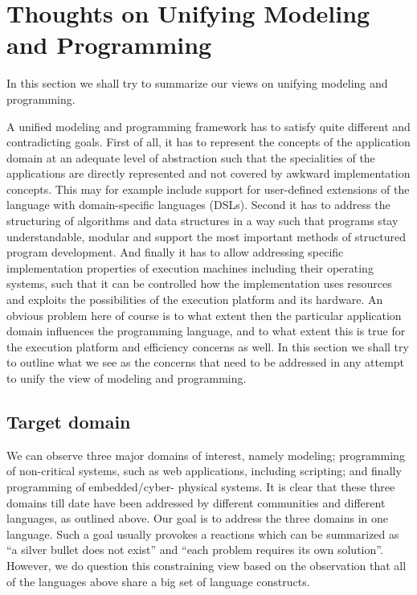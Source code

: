 

\section{Thoughts on Unifying Modeling and Programming}

In this section we shall try to summarize our views on 
unifying modeling and programming.

A unified modeling and programming framework has to satisfy 
quite different and contradicting goals.
First of all, it has to represent the concepts of the 
application domain at an adequate level of 
abstraction such that the specialities of the applications 
are directly represented and not covered by awkward implementation 
concepts. This may for example include support for user-defined 
extensions of the language with domain-specific languages (DSLs). 
Second it has to address the structuring of algorithms and data 
structures in a way such that programs stay understandable, 
modular and support the most important methods of structured 
program development. And finally it has to allow addressing 
specific implementation properties of execution machines including 
their operating systems, such that it can be controlled how the 
implementation uses resources and exploits the possibilities of 
the execution platform and its hardware. An obvious problem here 
of course is to what extent then the particular application domain 
influences the programming language, and to what extent this 
is true for the execution platform and efficiency concerns as
well. In this section we shall try to outline what we see as the 
concerns that need to be addressed in any attempt to unify the 
view of modeling and 
programming.

\subsection{Target domain}

We can observe three major domains of interest, namely modeling; 
programming of non-critical systems, such as web applications, 
including scripting; and finally programming of embedded/cyber-
physical systems. It is clear that these three domains till date 
have been addressed by different communities and different 
languages, as outlined above. Our goal is to address the three 
domains in one language. Such a goal usually provokes a reactions 
which can be summarized as
“a silver bullet does not exist” and “each problem requires its own 
solution”. However, we do question this constraining view based on 
the observation that all of the languages above share a big set of 
language constructs.

